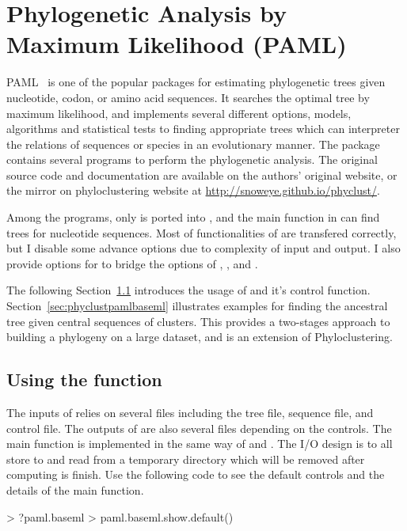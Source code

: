 
\section[Phylogenetic Analysis by Maximum Likelihood (PAML)]{Phylogenetic Analysis by Maximum Likelihood (PAML)}
\label{sec:paml}

PAML~\citep{Yang1997,Yang2007} is one of the popular packages for estimating
phylogenetic trees given nucleotide, codon, or amino acid sequences. It searches
the optimal tree by maximum likelihood, and implements several different
options, models, algorithms and statistical tests to finding appropriate
trees which can interpreter the relations of sequences or species in an
evolutionary manner. The package contains several programs to perform
the phylogenetic analysis.
The original source code and documentation are available on the authors'
original website, or the mirror on phyloclustering website at
\url{http://snoweye.github.io/phyclust/}.

Among the programs, only  is ported into
, and the main function  in 
can find trees for nucleotide sequences.
Most of functionalities of  are transfered correctly, but I
disable some advance options due to complexity of input and output.
I also provide options for  to bridge the options of
, , and .

The following Section~\ref{sec:pamlbaseml} introduces the usage of
 and it's control function.
Section~\ref{sec:phyclustpamlbaseml} illustrates examples for finding the
ancestral tree given central sequences of clusters.
This provides a two-stages approach to building a phylogeny on a large dataset,
and is an extension of Phyloclustering.




\subsection[Using the paml.baseml() function]{Using the  function}
\label{sec:pamlbaseml}
 
The inputs of  relies on several files
including the tree file, sequence file, and control file. The outputs of 
are also several files depending on the controls.
The main function  is implemented in the same way of 
and . The I/O design is to all store to and read from a temporary
directory which will be removed after computing is finish.
Use the following code to see the default controls and the details of the
main function.
\begin{Code}
> ?paml.baseml
> paml.baseml.show.default()
\end{Code}


